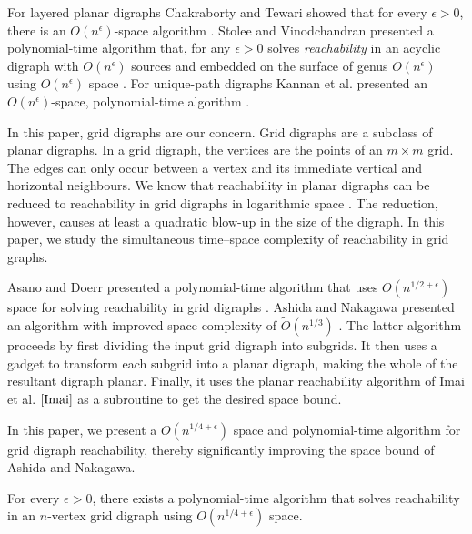 \documentclass{toc}
\begin{document}
For layered planar 
digraphs %
Chakraborty and Tewari showed that for every $\epsilon >0$, there is an $O(n^{\epsilon})$-space %
algorithm \cite{Chakraborty}. Stolee and Vinodchandran presented a polynomial-time algorithm that, for any $\epsilon > 0$ solves \emph{reachability} in 
%
an acyclic digraph %
with $O(n^{\epsilon})$ sources and embedded on the surface of genus $O(n^\epsilon)$ using $O(n^{\epsilon})$ space \cite{Stolee}. For unique-path 
digraphs %
Kannan et al. presented an %
$O(n^{\epsilon})$-space, %
%
polynomial-time algorithm \cite{kannan}.

In this paper, grid 
digraphs %
are our concern. Grid
digraphs %
are a subclass of planar
digraphs. %
In a grid 
digraph, %
%
the  %
vertices are
the %
%
points %
of an $m \times m$ grid.  %
%
The edges can only occur between a vertex and its immediate vertical
%
and  %
horizontal neighbours.  %
We know that reachability in planar 
digraphs %
%
can  %
be reduced to reachability in grid
digraphs %
 in logarithmic space \cite{Allender}. The reduction, however, causes at least a quadratic blow-up in the size of the 
digraph. %
In this paper, we study the simultaneous time--space complexity of reachability in grid graphs.

%
Asano and Doerr presented a polynomial-time algorithm that uses $O(n^{1/2 + \epsilon})$ space for solving reachability in grid 
%
%
%
digraphs  \cite{Asano11}.  %
Ashida and Nakagawa presented an algorithm with improved space complexity of $\widetilde{O}(n^{1/3})$ \cite{AshidaNakagawa}.
%
%
The latter algorithm %
proceeds  %
by first dividing the input grid 
digraph %
into subgrids. It then
%
uses  %
a gadget to transform each subgrid into a planar 
digraph, %
making the whole of the resultant 
digraph %
planar. Finally, it
%
uses  %
the planar reachability algorithm of Imai et al. $\cite{Imai}$ as a subroutine to get the desired space bound.
%

In this paper, we present a $O(n^{1/4 + \epsilon})$ space and polynomial-time algorithm for grid 
digraph %
reachability, thereby significantly improving the
%
space bound  %
of Ashida and Nakagawa.
\begin{theorem}
\label{thm:main}
For every $\epsilon > 0$, there exists a polynomial-time algorithm that
%
solves  %
reachability in an %
$n$-vertex   %
grid 
digraph %
using $O(n^{1/4 + \epsilon})$ space.
\end{theorem}
\end{document}
